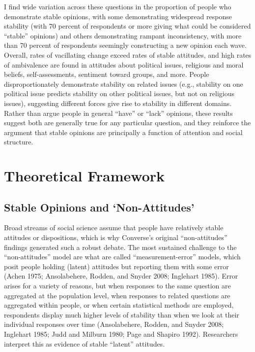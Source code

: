 \documentclass[12pt,]{article}
\begin{document}
I find wide variation across these questions in the proportion of people who demonstrate stable opinions, with some demonstrating widespread response stability (with 70 percent of respondents or more giving what could be considered ``stable'' opinions) and others demonstrating rampant inconsistency, with more than 70 percent of respondents seemingly constructing a new opinion each wave. Overall, rates of vacillating change exceed rates of stable attitudes, and high rates of ambivalence are found in attitudes about political issues, religious and moral beliefs, self-assessments, sentiment toward groups, and more. People disproportionately demonstrate stability on related issues (e.g., stability on one political issue predicts stability on other political issues, but not on religious issues), suggesting different forces give rise to stability in different domains. Rather than argue people in general ``have'' or ``lack'' opinions, these results suggest both are generally true for any particular question, and they reinforce the argument that stable opinions are principally a function of attention and social structure.

\hypertarget{theoretical-framework}{%
\section{Theoretical Framework}\label{theoretical-framework}}

\hypertarget{stable-opinions-and-non-attitudes}{%
\subsection{Stable Opinions and `Non-Attitudes'}\label{stable-opinions-and-non-attitudes}}

Broad streams of social science assume that people have relatively stable attitudes or dispositions, which is why Converse's original ``non-attitudes'' findings generated such a robust debate. The most sustained challenge to the ``non-attitudes'' model are what are called ``measurement-error'' models, which posit people holding (latent) attitudes but reporting them with some error (Achen 1975; Ansolabehere, Rodden, and Snyder 2008; Inglehart 1985). Error arises for a variety of reasons, but when responses to the same question are aggregated at the population level, when responses to related questions are aggregated within people, or when certain statistical methods are employed, respondents display much higher levels of stability than when we look at their individual responses over time (Ansolabehere, Rodden, and Snyder 2008; Inglehart 1985; Judd and Milburn 1980; Page and Shapiro 1992). Researchers interpret this as evidence of stable ``latent'' attitudes.
\end{document}
